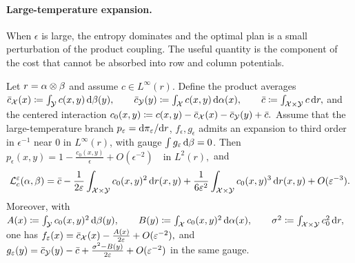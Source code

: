 \paragraph{Large-temperature expansion.}
When $\epsilon$ is large, the entropy dominates and the optimal plan is a small perturbation of the product coupling. The useful quantity is the component of the cost that cannot be absorbed into row and column potentials.

\begin{prop}\label{prop-large-epsilon-expansion}
Let $r=\alpha\otimes\beta$ and assume $c\in L^\infty(r)$. Define the product averages
\(\bar c_{\mathcal{X}}(x)\coloneqq\int_{\mathcal{Y}} c(x,y)\,\mathrm{d}\beta(y),\qquad \bar c_{\mathcal{Y}}(y)\coloneqq\int_{\mathcal{X}} c(x,y)\,\mathrm{d}\alpha(x),\qquad \bar c\coloneqq\int_{\mathcal{X}\times\mathcal{Y}}c\,\mathrm{d} r,\)
and the centered interaction
\(c_0(x,y)\coloneqq c(x,y)-\bar c_{\mathcal{X}}(x)-\bar c_{\mathcal{Y}}(y)+\bar c.\)
Assume that the large-temperature branch $p_\varepsilon=\mathrm{d}\pi_\varepsilon/\mathrm{d} r$, $f_\epsilon,g_\epsilon$ admits an expansion to third order in $\epsilon^{-1}$ near $0$ in $L^\infty(r)$, with gauge $\int g_\varepsilon\,\mathrm{d}\beta=0$. Then
\(p_\epsilon(x,y)=1-\frac{c_0(x,y)}{\epsilon}+O(\epsilon^{-2}) \quad\text{in }L^2(r),\)
and
\[
\mathcal{L}_c^\varepsilon(\alpha,\beta)
=
\bar c-\frac{1}{2\varepsilon}\int_{\mathcal{X}\times\mathcal{Y}} c_0(x,y)^2\,\mathrm{d} r(x,y)
+\frac{1}{6\varepsilon^2}\int_{\mathcal{X}\times\mathcal{Y}} c_0(x,y)^3\,\mathrm{d} r(x,y)
+O(\varepsilon^{-3}).
\]
Moreover, with \(A(x)\coloneqq\int_{\mathcal{Y}} c_0(x,y)^2\,\mathrm{d}\beta(y),\qquad B(y)\coloneqq\int_{\mathcal{X}} c_0(x,y)^2\,\mathrm{d}\alpha(x),\qquad \sigma^2\coloneqq\int_{\mathcal{X}\times\mathcal{Y}}c_0^2\,\mathrm{d} r,\)
one has \(f_\varepsilon(x)=\bar c_{\mathcal{X}}(x)-\frac{A(x)}{2\varepsilon}+O(\varepsilon^{-2}),\)
and
\(g_\varepsilon(y)=\bar c_{\mathcal{Y}}(y)-\bar c +\frac{\sigma^2-B(y)}{2\varepsilon}+O(\varepsilon^{-2})\)
in the same gauge.
\end{prop}
